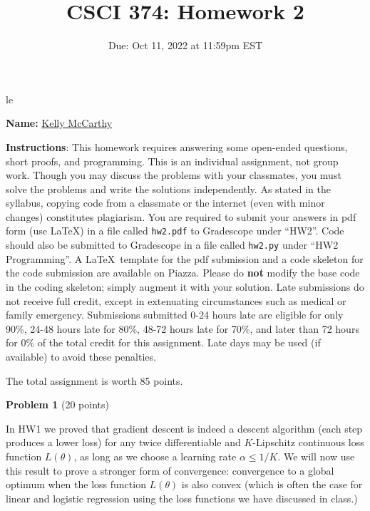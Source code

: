 \documentclass[letterpaper, 11pt]{article}
\title{CSCI 374: Homework 2}
\author{}
\date{Due: Oct 11, 2022 at 11:59pm EST}
\begin{document}
\maketitle

\setlength{\parindent}{0em}
\setlength{\parskip}{0.8em}le

\textbf{Name:} \underline{\hspace{30pt} \color{blue} Kelly McCarthy \hspace{30pt}}
\vspace{1em}

	\textbf{Instructions}: This homework requires answering some open-ended questions, short proofs, and
	programming. This is an individual assignment, not group work. Though you may
	discuss the problems with your classmates, you must solve the problems and
	write the solutions independently. As stated in the syllabus, copying code
	from a classmate or the internet (even with minor changes) constitutes
	plagiarism. You are required to submit your answers in pdf form (use \LaTeX)
	in a file called \texttt{hw2.pdf} to Gradescope under ``HW2''. Code should also be submitted to Gradescope in a file called \texttt{hw2.py} under ``HW2 Programming''. A \LaTeX\  template for the pdf submission and a code skeleton for the code submission are available on Piazza. Please do \textbf{not} modify the base code in the coding skeleton; simply augment it with your solution.
	Late submissions do not receive full credit, except in extenuating circumstances such
	as medical or family emergency. Submissions submitted 0-24 hours late are eligible for only 90\%, 24-48 hours late for 80\%, 48-72 hours late for 70\%, and later
	than 72 hours for 0\% of the total credit for this assignment. Late days may be used (if available) to avoid these penalties.
	
	The total assignment is worth 85 points.

\vspace{1em}

{\large\textbf{Problem 1}} (20 points)

In HW1 we proved that gradient descent is indeed a descent algorithm (each step produces a lower loss) for any twice differentiable and $K$-Lipschitz continuous loss function $L(\theta)$, as long as we choose a learning rate $\alpha \leq 1/K$. We will now use this result to prove a stronger form of convergence: convergence to a global optimum when the loss function $L(\theta)$ is also convex (which is often the case for linear and logistic regression using the loss functions we have discussed in class.)
\end{document}
